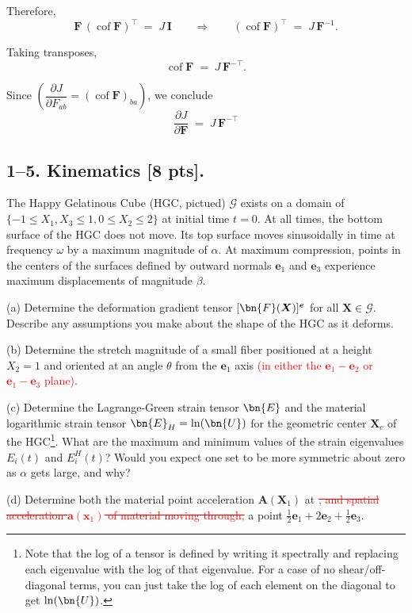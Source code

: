 Therefore,
$$
\bm{F}\,(\operatorname{cof}\bm{F})^\top \;=\; J\,\bm{I}
\qquad\Longrightarrow\qquad
(\operatorname{cof}\bm{F})^\top \;=\; J\,\bm{F}^{-1}.
$$

Taking transposes,
$$
\operatorname{cof}\bm{F} \;=\; J\,\bm{F}^{-\top}.
$$

Since $(\dfrac{\partial J}{\partial F_{ab}}=(\operatorname{cof}\bm{F})_{ba})$, we conclude
$$
\frac{\partial J}{\partial \bm{F}} \;=\; J\,\bm{F}^{-\top}
$$

\bigskip
\subsection*{1--5. \textbf{Kinematics} [8 pts].} The Happy Gelatinous Cube (HGC, pictued) $\mathcal{G}$ exists on a domain of $\{-1\leq X_1 , X_3\leq1, 0\leq X_2 \leq 2\}$ at initial time $t=0$. 
At all times, the bottom surface of the HGC does not move. 
Its top surface moves sinusoidally in time at frequency $\omega$ by a maximum magnitude of $\alpha$. 
At maximum compression, points in the centers of the surfaces defined by outward normals $\bm{e}_1$ and $\bm{e}_3$ experience maximum displacements of magnitude $\beta$. 

\medskip
(a) Determine the deformation gradient tensor $[\bn{F}(\bm{X})]^{\bm{e}}$ for all $\bm{X}\in \mathcal{G}$. 
Describe any assumptions you make about the shape of the HGC as it deforms. 

\medskip
(b) Determine the stretch magnitude of a small fiber positioned at a height $X_2 = 1$ and oriented at an angle $\theta$ from the $\bm{e}_1$ axis \textcolor{red}{(in either the $\bm{e}_1- \bm{e}_2$ or $\bm{e}_1- \bm{e}_3$ plane)}. 

\medskip
(c) Determine the Lagrange-Green strain tensor $\bn{E}$ and the material logarithmic strain tensor $\bn{E}_H = \ln (\bn{U})$ for the geometric center $\bm{X}_c$ of the HGC\footnote{Note that the log of a tensor is defined by writing it spectrally and replacing each eigenvalue with the log of that eigenvalue. For a case of no shear/off-diagonal terms, you can just take the log of each element on the diagonal to get $\ln(\bn{U})$.}. 
What are the maximum and minimum values of the strain eigenvalues $E_i(t)$ and $E_i^H(t)$? 
Would you expect one set to be more symmetric about zero as $\alpha$ gets large, and why?

\medskip
(d) Determine both the material point acceleration $\bm{A}(\bm{X}_1)$ at \textcolor{red}{\sout{, and spatial acceleration $\bm{a}(\bm{x}_1)$ of material moving through,}} a point $\frac{1}{2} \bm{e}_1 + 2\bm{e}_2 + \frac{1}{2} \bm{e}_3$.  

